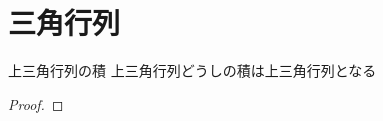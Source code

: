 \documentclass[../../../topic_linear-algebra]{subfiles}
\begin{document}
\sectionline
\section{三角行列}

\begin{theorem}{上三角行列の積}\label{thm:product-of-upper-triangular}
  上三角行列どうしの積は上三角行列となる
\end{theorem}

\begin{proof}
  \todo{}
\end{proof}
\end{document}
